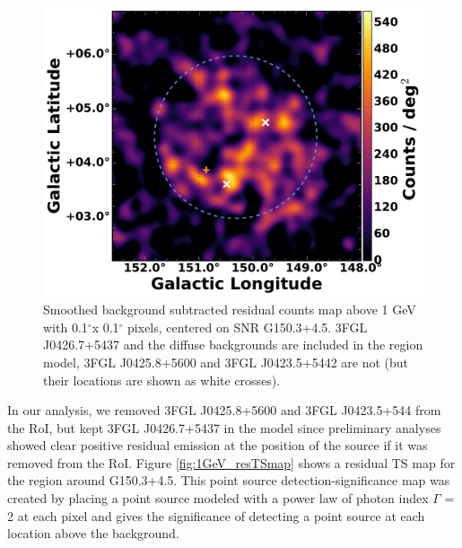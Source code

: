 \documentclass[iop]{emulateapj}
\newcommand{\gam}{$\gamma$-ray}
\newcommand{\Gone}{G150.3+4.5}
\newcommand{\psrLike}{3FGL J0426.7+5437}
\begin{document}
\begin{figure}[!ht]
	\begin{centering}
		\includegraphics[width=\columnwidth]{G150_1GeV_source_w3FGL_noLabs.pdf}
		\caption[Smoothed background subtracted residual counts map above 1 GeV for \Gone{}]{Smoothed background subtracted residual counts map above 1 GeV with 0.1$^\circ$x 0.1$^\circ$ pixels, centered on SNR \Gone. \psrLike{} and the diffuse backgrounds are included in the region model, 3FGL J0425.8+5600 and 3FGL J0423.5+5442 are not (but their locations are shown as white crosses). %
			\label{fig:1GeV_cmaps}}
	\end{centering}
\end{figure}

In our analysis, we removed 3FGL J0425.8+5600 and 3FGL J0423.5+544 from the RoI, but kept \psrLike{} in the model since preliminary analyses showed clear positive residual emission at the position of the source if it was removed from the RoI. Figure \ref{fig:1GeV_resTSmap} shows a residual TS map for the region around \Gone. This point source detection-significance map was created by placing a point source modeled with a power law of photon index $\Gamma$ = 2  at each pixel and gives the significance of detecting a point source at each location above the background. 
\end{document}
